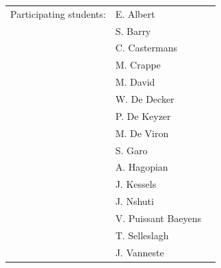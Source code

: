 \begin{titlepage}
\begin{center}
\begin{tabular}{lll}
    Participating students:
        & E. Albert & \\
        & S. Barry & \\
        & C. Castermans & \\
        & M. Crappe & \\
        & M. David & \\
        & W. De Decker & \\
        & P. De Keyzer & \\
        & M. De Viron & \\
        & S. Garo & \\
        & A. Hagopian & \\
        & J. Kessels & \\
        & J. Nshuti & \\ 
        & V. Puissant Baeyens & \\
        & T. Selleslagh & \\
        & J. Vanneste & 
\end{tabular}

\end{center}

\end{titlepage}


